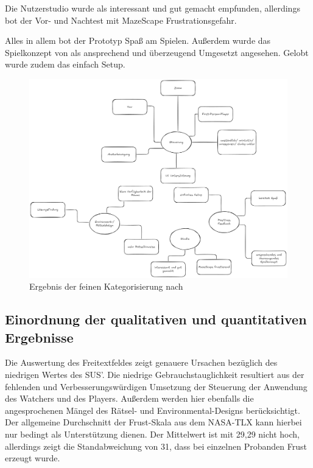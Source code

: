 Die Nutzerstudio wurde als interessant und gut gemacht empfunden, allerdings bot der Vor- und Nachtest mit MazeScape Frustrationsgefahr.

Alles in allem bot der Prototyp Spaß am Spielen. Außerdem wurde das Spielkonzept von  als ansprechend und überzeugend Umgesetzt angesehen. Gelobt wurde zudem das einfach Setup.
\begin{figure}[ht]
\centering
\includegraphics[width=1\linewidth]{content/pictures/Qualitative-Auswertung-Schritt-2.png}
\caption{Ergebnis der feinen Kategorisierung nach \cite{braun_using_2006}}
\label{fig:qualitative-results-end}
\end{figure}


\subsection{Einordnung der qualitativen und quantitativen Ergebnisse}
Die Auswertung des Freitextfeldes zeigt genauere Ursachen bezüglich des niedrigen Wertes des \ac{SUS}'. Die niedrige Gebrauchstauglichkeit resultiert aus der fehlenden  und Verbesserungswürdigen Umsetzung der Steuerung der Anwendung des Watchers und des Players. Außerdem werden hier ebenfalls die angesprochenen Mängel des Rätsel- und Environmental-Designs berücksichtigt. Der allgemeine Durchschnitt der Frust-Skala aus dem \ac{NASA-TLX} kann hierbei nur bedingt als Unterstützung dienen. Der Mittelwert ist mit 29,29 nicht hoch, allerdings zeigt die Standabweichung von 31, dass bei einzelnen Probanden Frust erzeugt wurde. 

